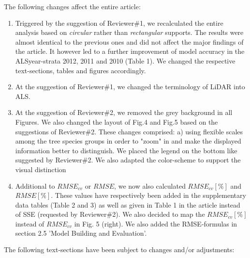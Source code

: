 \documentclass{article}
\begin{document}
The following changes affect the entire article:

\begin{enumerate}
	
	\item Triggered by the suggestion of Reviewer\#1, we recalculated the entire analysis based on \textit{circular} rather than \textit{rectangular} supports. The results were almost identical to the previous ones and did not affect the major findings of the article. It however led to a further improvement of model accuracy in the ALSyear-strata 2012, 2011 and 2010 (Table 1). We changed the respective text-sections, tables and figures accordingly.
	
    \item At the suggestion of Reviewer\#1, we changed the terminology of LiDAR into ALS.
    
    \item At the suggestion of Reviewer\#2, we removed the grey background in all Figures. We also changed the layout of Fig.4 and Fig.5 based on the suggestions of Reviewer\#2. These changes comprised: a) using flexible scales among the tree species groups in order to "zoom" in and make the displayed information better to distinguish. We placed the legend on the bottom like suggested by Reviewer\#2. We also adapted the color-scheme to support the visual distinction
    
    \item Additional to $RMSE_{cv}$ or $RMSE$, we now also calculated $RMSE_{cv}[\%]$ and $RMSE[\%]$. These values have respectively been added in the supplementary data tables (Table 2 and 3) as well as given in Table 1 in the article instead of SSE (requested by Reviewer\#2). We also decided to map the $RMSE_{cv}[\%]$ instead of $RMSE_{cv}$ in Fig. 5 (right). We also added the RMSE-formulas in section 2.5 'Model Building and Evaluation'.

\end{enumerate}



The following text-sections have been subject to changes and/or adjustments:
\end{document}
